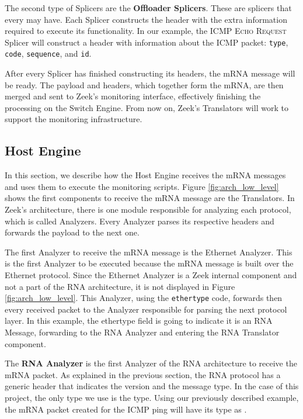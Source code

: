 The second type of Splicers are the \textbf{Offloader Splicers}. These are splicers that every \Offloader{} may have. Each \Offloader{} Splicer constructs the header with the extra information required to execute its functionality. In our example, the \textsc{ICMP Echo Request} Splicer will construct a header with information about the ICMP packet: \texttt{type}, \texttt{code}, \texttt{sequence}, and \texttt{id}.


After every Splicer has finished constructing its headers, the mRNA message will be ready. The payload and headers, which together form the mRNA, are then merged and sent to Zeek's monitoring interface, effectively finishing the processing on the Switch Engine. From now on, Zeek's Translators will work to support the monitoring infrastructure.

\subsection{Host Engine}

In this section, we describe how the Host Engine receives the mRNA messages and uses them to execute the monitoring scripts. Figure \ref{fig:arch_low_level} shows the first components to receive the mRNA message are the Translators. In Zeek's architecture, there is one module responsible for analyzing each protocol, which is called Analyzers. Every Analyzer parses its respective headers and forwards the payload to the next one.

The first Analyzer to receive the mRNA message is the Ethernet Analyzer. This is the first Analyzer to be executed because the mRNA message is built over the Ethernet protocol. Since the Ethernet Analyzer is a Zeek internal component and not a part of the RNA architecture, it is not displayed in Figure \ref{fig:arch_low_level}. This Analyzer, using the \texttt{ethertype} code, forwards then every received packet to the Analyzer responsible for parsing the next protocol layer. In this example, the ethertype field is going to indicate it is an RNA Message, forwarding to the RNA Analyzer and entering the RNA Translator component.

The \textbf{RNA Analyzer} is the first Analyzer of the RNA architecture to receive the mRNA packet. As explained in the previous section, the RNA protocol has a generic header that indicates the version and the message type. In the case of this project, the only type we use is the \Offloader{} type\footnotemark. Using our previously described example, the mRNA packet created for the ICMP ping will have its type as \textsc{\Offloader{}}.

